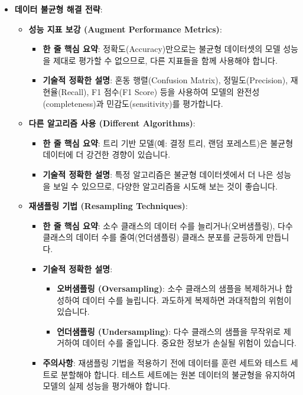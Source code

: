 \documentclass[11pt,a4paper]{article}
\begin{document}
\begin{itemize}
\begin{itemize}
\begin{itemize}
    \item \textbf{데이터 불균형 해결 전략}:
    \begin{itemize}
        \item \textbf{성능 지표 보강 (Augment Performance Metrics)}:
        \begin{itemize}
            \item \textbf{한 줄 핵심 요약}: 정확도(Accuracy)만으로는 불균형 데이터셋의 모델 성능을 제대로 평가할 수 없으므로, 다른 지표들을 함께 사용해야 합니다.
            \item \textbf{기술적 정확한 설명}: 혼동 행렬(Confusion Matrix), 정밀도(Precision), 재현율(Recall), F1 점수(F1 Score) 등을 사용하여 모델의 완전성(completeness)과 민감도(sensitivity)를 평가합니다.
        \end{itemize}
        \item \textbf{다른 알고리즘 사용 (Different Algorithms)}:
        \begin{itemize}
            \item \textbf{한 줄 핵심 요약}: 트리 기반 모델(예: 결정 트리, 랜덤 포레스트)은 불균형 데이터에 더 강건한 경향이 있습니다.
            \item \textbf{기술적 정확한 설명}: 특정 알고리즘은 불균형 데이터셋에서 더 나은 성능을 보일 수 있으므로, 다양한 알고리즘을 시도해 보는 것이 좋습니다.
        \end{itemize}
        \item \textbf{재샘플링 기법 (Resampling Techniques)}:
        \begin{itemize}
            \item \textbf{한 줄 핵심 요약}: 소수 클래스의 데이터 수를 늘리거나(오버샘플링), 다수 클래스의 데이터 수를 줄여(언더샘플링) 클래스 분포를 균등하게 만듭니다.
            \item \textbf{기술적 정확한 설명}:
            \begin{itemize}
                \item \textbf{오버샘플링 (Oversampling)}: 소수 클래스의 샘플을 복제하거나 합성하여 데이터 수를 늘립니다. 과도하게 복제하면 과대적합의 위험이 있습니다.
                \item \textbf{언더샘플링 (Undersampling)}: 다수 클래스의 샘플을 무작위로 제거하여 데이터 수를 줄입니다. 중요한 정보가 손실될 위험이 있습니다.
            \end{itemize}
            \item \textbf{주의사항}: 재샘플링 기법을 적용하기 전에 데이터를 훈련 세트와 테스트 세트로 분할해야 합니다. 테스트 세트에는 원본 데이터의 불균형을 유지하여 모델의 실제 성능을 평가해야 합니다.

\end{itemize}
\end{itemize}
\end{itemize}
\end{itemize}
\end{itemize}
\end{document}
